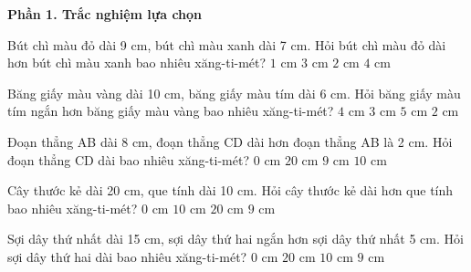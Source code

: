 \textbf{Phần 1. Trắc nghiệm lựa chọn}

\begin{ex} %
Bút chì màu đỏ dài 9 cm, bút chì màu xanh dài 7 cm. Hỏi bút chì màu đỏ dài hơn bút chì màu xanh bao nhiêu xăng-ti-mét?
\choice
{$1\text{ cm}$}
{$3\text{ cm}$}
{\True $2\text{ cm}$}
{$4\text{ cm}$}
\end{ex}

\begin{ex} %
Băng giấy màu vàng dài 10 cm, băng giấy màu tím dài 6 cm. Hỏi băng giấy màu tím ngắn hơn băng giấy màu vàng bao nhiêu xăng-ti-mét?
\choice
{\True $4\text{ cm}$}
{$3\text{ cm}$}
{$5\text{ cm}$}
{$2\text{ cm}$}
\end{ex}

\begin{ex} %
Đoạn thẳng AB dài 8 cm, đoạn thẳng CD dài hơn đoạn thẳng AB là 2 cm. Hỏi đoạn thẳng CD dài bao nhiêu xăng-ti-mét?
\choice
{$0\text{ cm}$}
{$20\text{ cm}$}
{$9\text{ cm}$}
{\True $10\text{ cm}$}
\end{ex}

\begin{ex} %
Cây thước kẻ dài 20 cm, que tính dài 10 cm. Hỏi cây thước kẻ dài hơn que tính bao nhiêu xăng-ti-mét?
\choice
{$0\text{ cm}$}
{\True $10\text{ cm}$}
{$20\text{ cm}$}
{$9\text{ cm}$}
\end{ex}

\begin{ex} %
Sợi dây thứ nhất dài 15 cm, sợi dây thứ hai ngắn hơn sợi dây thứ nhất 5 cm. Hỏi sợi dây thứ hai dài bao nhiêu xăng-ti-mét?
\choice
{$0\text{ cm}$}
{$20\text{ cm}$}
{\True $10\text{ cm}$}
{$9\text{ cm}$}
\end{ex}


